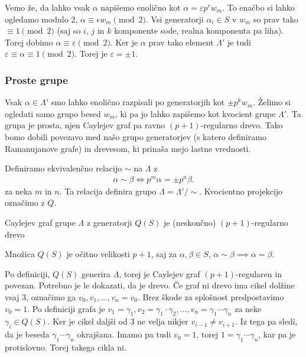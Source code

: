 \begin{dokaz}
    Vemo že, da lahko vsak \(\alpha\) napišemo enolično kot \(\alpha = \varepsilon p^r w_m\). To enačbo si lahko ogledamo modulo 2, \(\alpha \equiv \epsilon w_m \pmod 2\). Vsi generatorji \(\alpha_i\in S\) v \(w_m\) so prav tako \(\equiv 1 \pmod 2\) (saj so \(i\), \(j\) in \(k\) komponente sode, realna komponenta pa liha). Torej dobimo \(\alpha \equiv \varepsilon \pmod 2\). Ker je \(\alpha\) prav tako element \(\Lambda'\) je tudi \(\varepsilon \equiv \alpha \equiv 1 \pmod 2\). Torej je \(\varepsilon = \pm 1\).  
\end{dokaz}

\subsubsection{Proste grupe}
Vsak \(\alpha\in \Lambda'\) smo lahko enolično razpisali po generatorjih kot \(\pm p^k w_m\). Želimo si ogledati samo grupo besed \(w_m\), ki pa jo lahko zapišemo kot kvocient grupe \(\Lambda'\). Ta grupa je prosta, njen Caylejev graf pa ravno \((p+1)\)-regularno drevo. Tako bomo dobili povezavo med našo grupo generatorjev (s katero definiramo Ramanujanove grafe) in drevesom, ki prinaša mejo lastne vrednosti.

Definiramo ekvivalenčno relacijo \(\sim\) na \(\Lambda\) z 
\begin{align*}
    \alpha \sim \beta \iff p^m \alpha = \pm p^n \beta.
\end{align*}
za neka \(m\) in \(n\). Ta relacija definira grupo \(\Lambda = \Lambda'/\sim\). Kvocientno projekcijo označimo z \(Q\).

\begin{izrek}
    Caylejev graf grupe \(\Lambda\) z generatorji \(Q(S)\) je (neskončno) \((p+1)\)-regularno drevo
\end{izrek}
\begin{dokaz}
    Množica \(Q(S)\) je očitno velikosti \(p+1\), saj za \(\alpha,\beta\in S\), \(\alpha\sim \beta \implies \alpha=\beta\).

    Po definiciji, \(Q(S)\) generira \(\Lambda\), torej je Caylejev graf \((p+1)\)-regularen in povezan. Potrebno je le dokazati, da je drevo. Če graf ni drevo ima cikel dolžine vsaj \(3\), označimo ga \(v_0, v_1, \ldots, v_n=v_0\). Brez škode za splošnost predpostavimo \(v_0=1\). Po definiciji grafa je \(v_1=\gamma_1, v_2 = \gamma_1 \cdot \gamma_2,\ldots,v_n = \gamma_1\cdots\gamma_n\) za neke \(\gamma_i\in Q(S)\). Ker je cikel daljši od 3 ne velja nikjer \(v_{i-1}\neq v_{i+1}\). Iz tega pa sledi, da je beseda \(\gamma_1\cdots\gamma_n\) okrajšana. Imamo pa tudi \(v_0=1\), torej \(1 = \gamma_1\cdots\gamma_n\), kar pa je protislovno. Torej takega cikla ni.
\end{dokaz}


